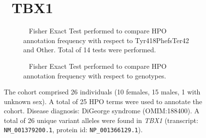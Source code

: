 \begin{figure}[htbp]
\section*{ TBX1}
\centering
\begin{subfigure}[b]{0.95\textwidth}
\centering
{}
\captionsetup{justification=raggedright,singlelinecheck=false}
\caption{         Fisher Exact Test performed to compare HPO annotation frequency with respect to Tyr418PhefsTer42 and Other. Total of
        14 tests were performed. }
\end{subfigure}
\vspace{2em}
\begin{subfigure}[b]{0.95\textwidth}
\centering
{}
\captionsetup{justification=raggedright,singlelinecheck=false}
\caption{             Fisher Exact Test performed to compare HPO annotation frequency with respect to genotypes. }
\end{subfigure}

\vspace{2em}

\caption{ The cohort comprised 26 individuals (10 females, 15 males, 1 with unknown sex). A total of 25 HPO terms were used to annotate the cohort. Disease diagnosis: DiGeorge syndrome (OMIM:188400).  A total of 26 unique variant alleles were found in \textit{TBX1} (transcript: \texttt{NM\_001379200.1}, protein id: \texttt{NP\_001366129.1}).}
\end{figure}
